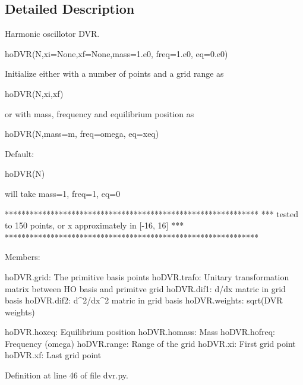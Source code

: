 \subsection{Detailed Description}
\begin{DoxyVerb}Harmonic oscillotor DVR.

hoDVR(N,xi=None,xf=None,mass=1.e0, freq=1.e0, eq=0.e0)

Initialize either with a number of points and a grid range as 

    hoDVR(N,xi,xf)

or with mass, frequency and equilibrium position as

    hoDVR(N,mass=m, freq=omega, eq=xeq)

Default:

    hoDVR(N)

will take mass=1, freq=1, eq=0

*************************************************************
*** tested to 150 points, or x approximately in [-16, 16] ***
*************************************************************


Members:

   hoDVR.grid:     The primitive basis points
   hoDVR.trafo:    Unitary transformation matrix between 
                   HO basis and primitve grid
   hoDVR.dif1:     d/dx matric in grid basis
   hoDVR.dif2:     d^2/dx^2 matric in grid basis
   hoDVR.weights:  sqrt(DVR weights)  

   hoDVR.hoxeq:    Equilibrium position
   hoDVR.homass:   Mass
   hoDVR.hofreq:   Frequency (omega)
   hoDVR.range:    Range of the grid 
   hoDVR.xi:       First grid point
   hoDVR.xf:       Last grid point
\end{DoxyVerb}
 

Definition at line 46 of file dvr.\+py.



